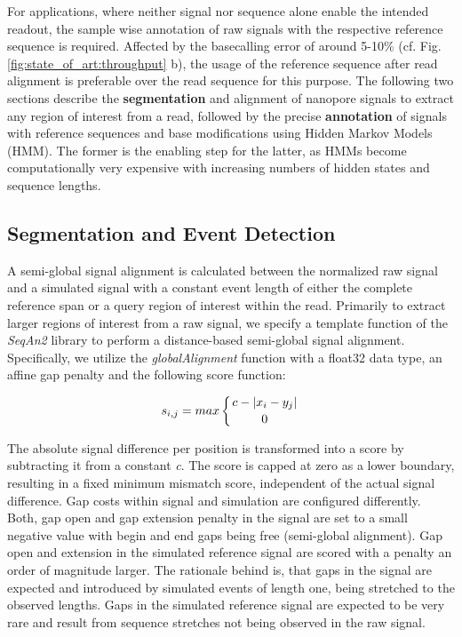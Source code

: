 For applications, where neither signal nor sequence alone enable the intended readout, the sample wise annotation of raw signals with the respective reference sequence is required. Affected by the basecalling error of around 5-10\% (cf. Fig. \ref{fig:state_of_art:throughput} b), the usage of the reference sequence after read alignment is preferable over the read sequence for this purpose. The following two sections describe the \textbf{segmentation} and alignment of nanopore signals to extract any region of interest from a read, followed by the precise \textbf{annotation} of signals with reference sequences and base modifications using Hidden Markov Models (HMM). The former is the enabling step for the latter, as HMMs become computationally very expensive with increasing numbers of hidden states and sequence lengths.




\subsection{Segmentation and Event Detection}
\label{subsec:signal:segmentation}

A semi-global signal alignment is calculated between the normalized raw signal and a simulated signal with a constant event length of either the complete reference span or a query region of interest within the read. Primarily to extract larger regions of interest from a raw signal, we specify a template function of the \textit{SeqAn2} \cite{Reinert2017} library to perform a distance-based semi-global signal alignment. Specifically, we utilize the \textit{globalAlignment} function with a float32 data type, an affine gap penalty and the following score function:

\begin{equation}
s_{i,j} = max \left\lbrace c - \left| x_{i} - y_{j} \right| \atop 0 \right.
\end{equation}

The absolute signal difference per position is transformed into a score by subtracting it from a constant \textit{c}. The score is capped at zero as a lower boundary, resulting in a fixed minimum mismatch score, independent of the actual signal difference.
Gap costs within signal and simulation are configured differently. 
Both, gap open and gap extension penalty in the signal are set to a small negative value with begin and end gaps being free (semi-global alignment). Gap open and extension in the simulated reference signal are scored with a penalty an order of magnitude larger. 
The rationale behind is, that gaps in the signal are expected and introduced by simulated events of length one, being stretched to the observed lengths. Gaps in the simulated reference signal are expected to be very rare and result from sequence stretches not being observed in the raw signal.

